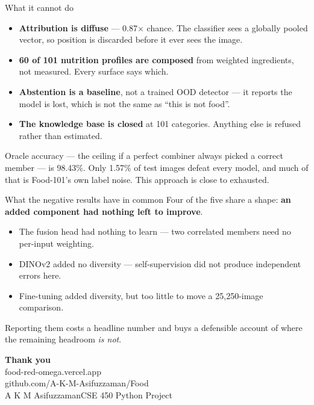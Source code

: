\documentclass[aspectratio=169,11pt]{beamer}
\newcommand{\StudentName}{A K M Asifuzzaman}
\newcommand{\CourseCode}{CSE 450 Python Project}
\begin{document}
\begin{frame}{What it cannot do}
\begin{itemize}
  \item \textbf{Attribution is diffuse} --- 0.87$\times$ chance. The classifier sees a
        globally pooled vector, so position is discarded before it ever sees the image.
  \item \textbf{60 of 101 nutrition profiles are composed} from weighted ingredients, not
        measured. Every surface says which.
  \item \textbf{Abstention is a baseline}, not a trained OOD detector --- it reports the
        model is lost, which is not the same as ``this is not food''.
  \item \textbf{The knowledge base is closed} at 101 categories. Anything else is refused
        rather than estimated.
\end{itemize}
\vspace{0.8em}
{\color{dim} Oracle accuracy --- the ceiling if a perfect combiner always picked a correct
member --- is 98.43\%. Only 1.57\% of test images defeat every model, and much of that is
Food-101's own label noise. This approach is close to exhausted.}
\end{frame}

\begin{frame}{What the negative results have in common}
\vspace{0.8em}
{\large Four of the five share a shape: \textbf{an added component had nothing left to
improve}.}
\vspace{1.2em}
\begin{itemize}
  \item The fusion head had nothing to learn --- two correlated members need no per-input
        weighting.
  \item DINOv2 added no diversity --- self-supervision did not produce independent errors
        here.
  \item Fine-tuning added diversity, but too little to move a 25{,}250-image comparison.
\end{itemize}
\vspace{1.2em}
{\color{dim} Reporting them costs a headline number and buys a defensible account of where
the remaining headroom \emph{is not}.}
\end{frame}

\begin{frame}[plain]
\vspace{2.2em}
\begin{center}
{\Huge\bfseries\color{comicred} Thank you}\\[1.4em]
{\large food-red-omega.vercel.app}\\[0.5em]
{\normalsize github.com/A-K-M-Asifuzzaman/Food}\\[2em]
{\color{dim} \StudentName \quad\textbullet\quad \CourseCode}
\end{center}
\end{frame}
\end{document}

